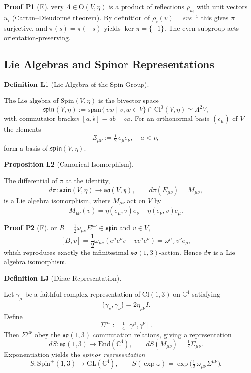 \documentclass[10pt, letterpaper]{article}
\newcommand{\End}{\mathrm{End}}
\newcommand{\C}{\mathbb{C}}
\newcommand{\Cl}{\mathrm{Cl}}
\newcommand{\GL}{\mathrm{GL}}
\newcommand{\Spin}{\mathrm{Spin}}
\newcommand{\Ogroup}{\mathrm{O}}
\newcommand{\CustomHeading}[3]{%
  \par\medskip\noindent%
  \textbf{#1 #2} \textnormal{(#3)}.\enskip%
}
\newenvironment{DEF}[2]{\begin{unitbox}\CustomHeading{Definition}{#1}{#2}}{\end{unitbox}}
\newenvironment{PROP}[2]{\begin{unitbox}\CustomHeading{Proposition}{#1}{#2}}{\end{unitbox}}
\newenvironment{PROOF}[2]{\begin{unitbox}\CustomHeading{Proof}{#1}{#2}}{\end{unitbox}}
\begin{document}
\begin{PROOF}{P1}
Every $\Lambda\in \Ogroup(V,\eta)$ is a product of reflections $\rho_{u_i}$ with unit vectors $u_i$ (Cartan--Dieudonné theorem).  
By definition of $\rho_s(v)=s v s^{-1}$ this gives $\pi$ surjective, and $\pi(s)=\pi(-s)$ yields $\ker\pi=\{\pm1\}$.  
The even subgroup acts orientation-preserving.
\end{PROOF}

\subsection{Lie Algebras and Spinor Representations}

\begin{DEF}{L1}{Lie Algebra of the Spin Group}
The Lie algebra of $\Spin(V,\eta)$ is the bivector space
\[
\mathfrak{spin}(V,\eta):=\mathrm{span}\{\, v w \mid v,w\in V\}\cap \Cl^0(V,\eta)
\simeq \Lambda^2 V,
\]
with commutator bracket $[a,b]=ab-ba$.  
For an orthonormal basis $(e_\mu)$ of $V$ the elements
\[
E_{\mu\nu}:=\tfrac12\,e_\mu e_\nu,\quad \mu<\nu,
\]
form a basis of $\mathfrak{spin}(V,\eta)$.
\end{DEF}

\begin{PROP}{L2}{Canonical Isomorphism}
The differential of $\pi$ at the identity,
\[
d\pi:\mathfrak{spin}(V,\eta)\longrightarrow \mathfrak{so}(V,\eta),
\qquad
d\pi(E_{\mu\nu}) = M_{\mu\nu},
\]
is a Lie algebra isomorphism, where $M_{\mu\nu}$ act on $V$ by
\[
M_{\mu\nu}(v) = \eta(e_\mu,v)e_\nu - \eta(e_\nu,v)e_\mu.
\]
\end{PROP}

\begin{PROOF}{P2}
For $B=\frac12\omega_{\mu\nu}E^{\mu\nu}\in\mathfrak{spin}$ and $v\in V$,
\[
[B,v]=\frac12\omega_{\mu\nu}(e^\mu e^\nu v - v e^\mu e^\nu)
= \omega^\mu{}_\nu\,v^\nu e_\mu,
\]
which reproduces exactly the infinitesimal $\mathfrak{so}(1,3)$-action. 
Hence $d\pi$ is a Lie algebra isomorphism.
\end{PROOF}

\begin{DEF}{L3}{Dirac Representation}
Let $\gamma_\mu$ be a faithful complex representation of $\Cl(1,3)$ on $\C^4$ satisfying
\[
\{\gamma_\mu,\gamma_\nu\} = 2\eta_{\mu\nu}I.
\]
Define
\[
\Sigma^{\mu\nu} := \tfrac14[\gamma^\mu,\gamma^\nu].
\]
Then $\Sigma^{\mu\nu}$ obey the $\mathfrak{so}(1,3)$ commutation relations, giving a representation
\[
dS:\mathfrak{so}(1,3)\to \End(\C^4),\qquad 
dS(M_{\mu\nu}) = \tfrac12\Sigma_{\mu\nu}.
\]
Exponentiation yields the \emph{spinor representation}
\[
S:\Spin^+(1,3)\to \GL(\C^4),\qquad S(\exp \omega)=\exp\!\big(\tfrac12\,\omega_{\mu\nu}\Sigma^{\mu\nu}\big).
\]
\end{DEF}
\end{document}

